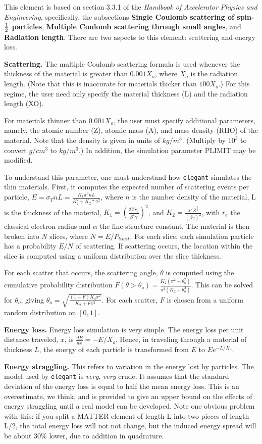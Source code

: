 This element is based on section 3.3.1 of the {\em Handbook of
Accelerator Physics and Engineering}, specifically, the
subsections {\bf Single Coulomb scattering of spin-${\rm \frac{1}{2}}$
particles}, {\bf Multiple Coulomb scattering through small angles},
and {\bf Radiation length}.
There are two aspects to this element: scattering and energy loss.

{\bf Scattering.}  The multiple Coulomb scattering formula is used
whenever the thickness of the material is greater than $0.001 X_o$,
where $X_o$ is the radiation length.  (Note that this is inaccurate
for materials thicker than $100 X_o$.)  For this regime, the user need
only specify the material thickness (L) and the radiation length (XO).

For materials thinner than $0.001 X_o$, the user must specify
additional parameters, namely, the atomic number (Z), atomic mass (A),
and mass density (RHO) of the material.  Note that the density is
given in units of $kg/m^3$.  (Multiply by $10^3$ to convert $g/cm^3$
to $kg/m^3$.)  In addition, the simulation parameter PLIMIT may be
modified.  

To understand this parameter, one must understand how {\tt elegant}
simulates the thin materials.  First, it computes the expected number
of scattering events per particle, $ E = \sigma_T n L = \frac{K_1
\pi^3 n L}{K_2^2 + K_2*\pi^2} $, where $n$ is the number density of
the material, L is the thickness of the material, $K_1 = (\frac{2 Z
r_e}{\beta^2 \gamma})^2$, and $K_2 = \frac{\alpha^2
Z^\frac{2}{3}}{(\beta\gamma)^2}$, with $r_e$ the classical electron radius
and $\alpha$ the fine structure constant.  The material is then broken
into $N$ slices, where $N = E/P_{limit}$.  For each slice, each
simulation particle has a probability $E/N$ of scattering.  If scattering
occurs, the location within the slice is computed using a uniform
distribution over the slice thickness.

For each scatter that occurs, the scattering angle, $\theta$ is
computed using the cumulative probability distribution
$F(\theta>\theta_o) = \frac{K_2 (\pi^2 - \theta_o^2)}{\pi^2 (K_2 +
\theta_o^2)}$.  This can be solved for $\theta_o$, giving
$\theta_o = \sqrt{\frac{(1-F)K_2\pi^2}{K_2 + F \pi^2}}$.  For each scatter,
$F$ is chosen from a uniform random distribution on $[0,1]$.

{\bf Energy loss.}  Energy loss simulation is very simple.
The energy loss per unit distance traveled, $x$, is 
$\frac{dE}{dx} = -E/X_o$.  Hence, in traveling through a
material of thickness $L$, the energy of each particle is
transformed from $E$ to $E e^{-L/X_o}$.  

{\bf Energy straggling.} This refers to variation in the energy lost
by particles.  The model used by {\tt elegant} is {\em very}, {\em
very} crude.  It assumes that the standard deviation of the energy
loss is equal to half the mean energy loss.  This is an overestimate,
we think, and is provided to give an upper bound on the effects of
energy straggling until a real model can be developed.  Note one
obvious problem with this: if you split a MATTER element of length L
into two pieces of length L/2, the total energy loss will not not
change, but the induced energy spread will be about 30\% lower, due to
addition in quadrature.
